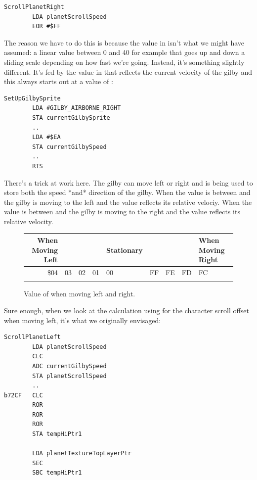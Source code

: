 \begin{lstlisting}
ScrollPlanetRight   
        LDA planetScrollSpeed
        EOR #$FF
\end{lstlisting}

The reason we have to do this is because the value in  isn't what we might have
assumed: a linear value between 0 and 40 for example that goes up and down a sliding scale depending on
how fast we're going. Instead, it's something slightly different. It's fed by the value in 
that reflects the current velocity of the gilby and this always starts out at a value of :

\begin{lstlisting}
SetUpGilbySprite
        LDA #GILBY_AIRBORNE_RIGHT
        STA currentGilbySprite
        ..
        LDA #$EA
        STA currentGilbySpeed
        ..
        RTS
\end{lstlisting}

There's a trick at work here. The gilby can move left or right and  is being used to
store both the speed *and* direction of the gilby. When the value is between  and  the gilby is moving
to the left and the value reflects its relative velociy. When the value is between  and  the gilby is
moving to the right and the value reflects its relative velocity.


\begin{figure}[H]
  {
    \setlength{\tabcolsep}{3.0pt}
    \setlength\cmidrulewidth{\heavyrulewidth} %
    \begin{adjustbox}{width=6cm,center}

      \begin{tabular}{rllllllll}
        \toprule
        When Moving Left &  & & & Stationary &  & & & When Moving Right    \\
        \midrule
        \$04 & 03 & 02 & 01 & 00 & FF & FE & FD & FC \\
        \addlinespace
        \bottomrule
      \end{tabular}
    \end{adjustbox}
  }\caption{Value of  when moving left and right.}
\end{figure}

Sure enough, when we look at the calculation using for the character scroll offset when moving left, it's what we
originally envisaged:

\begin{lstlisting}
ScrollPlanetLeft
        LDA planetScrollSpeed
        CLC
        ADC currentGilbySpeed
        STA planetScrollSpeed
        ..
b72CF   CLC
        ROR
        ROR
        ROR
        STA tempHiPtr1

        LDA planetTextureTopLayerPtr
        SEC
        SBC tempHiPtr1
\end{lstlisting}

